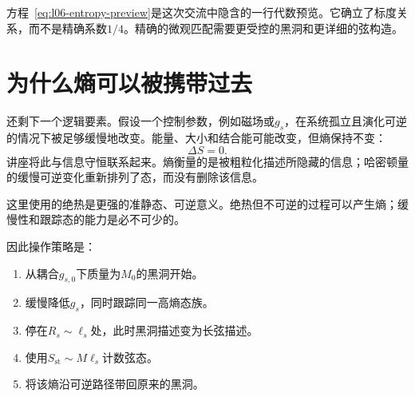 方程~\eqref{eq:l06-entropy-preview}是这次交流中隐含的一行代数预览。它确立了标度关系，而不是精确系数\(1/4\)。精确的微观匹配需要更受控的黑洞和更详细的弦构造。

\section{为什么熵可以被携带过去}

还剩下一个逻辑要素。假设一个控制参数，例如磁场或\(g_s\)，在系统孤立且演化可逆的情况下被足够缓慢地改变。能量、大小和结合能可能改变，但熵保持不变：
\begin{equation}
\Delta S=0.
\label{eq:l06-adiabatic-entropy}
\end{equation}
讲座将此与信息守恒联系起来。熵衡量的是被粗粒化描述所隐藏的信息；哈密顿量的缓慢可逆变化重新排列了态，而没有删除该信息。

\begin{classroomqa}
\end{classroomqa}

这里使用的绝热是更强的准静态、可逆意义。绝热但不可逆的过程可以产生熵；缓慢性和跟踪态的能力是必不可少的。

\begin{classroomqa}
\end{classroomqa}

因此操作策略是：
\begin{enumerate}
\item 从耦合\(g_{s,0}\)下质量为\(M_0\)的黑洞开始。
\item 缓慢降低\(g_s\)，同时跟踪同一高熵态族。
\item 停在\(R_s\sim\ell_s\)处，此时黑洞描述变为长弦描述。
\item 使用\(S_{\mathrm{st}}\sim M\ell_s\)计数弦态。
\item 将该熵沿可逆路径带回原来的黑洞。
\end{enumerate}

